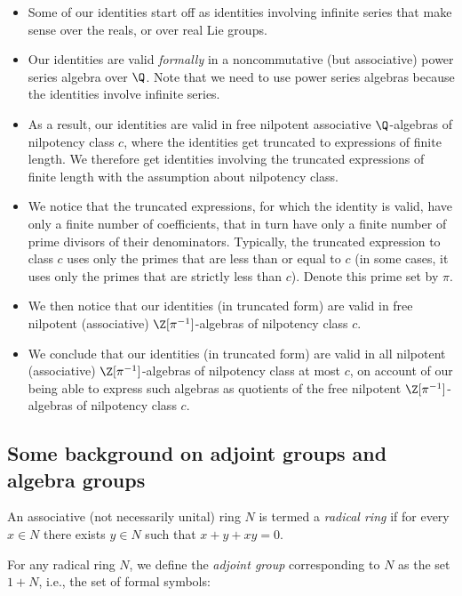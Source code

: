 \documentclass{ucetd}
\begin{document}
\begin{itemize}
\item Some of our identities start off as identities involving
  infinite series that make sense over the reals, or over real Lie
  groups.
\item Our identities are valid {\em formally} in a noncommutative (but
  associative) power series algebra over $\Q$. Note that we need to
  use power series algebras because the identities involve infinite
  series.
\item As a result, our identities are valid in free nilpotent
  associative $\Q$-algebras of nilpotency class $c$, where the
  identities get truncated to expressions of finite length. We
  therefore get identities involving the truncated expressions of
  finite length with the assumption about nilpotency class.
\item We notice that the truncated expressions, for which the identity
  is valid, have only a finite number of coefficients, that in turn
  have only a finite number of prime divisors of their
  denominators. Typically, the truncated expression to class $c$ uses
  only the primes that are less than or equal to $c$ (in some cases,
  it uses only the primes that are strictly less than $c$). Denote
  this prime set by $\pi$.
\item We then notice that our identities (in truncated form) are valid
  in free nilpotent (associative) $\Z[\pi^{-1}]$-algebras of
  nilpotency class $c$.
\item We conclude that our identities (in truncated form) are valid in
  all nilpotent (associative) $\Z[\pi^{-1}]$-algebras of nilpotency
  class at most $c$, on account of our being able to express such
  algebras as quotients of the free nilpotent $\Z[\pi^{-1}]$-algebras
  of nilpotency class $c$.
\end{itemize}

\subsection{Some background on adjoint groups and algebra groups}\label{sec:adjoint-group}

An associative (not necessarily unital) ring $N$ is termed a {\em
  radical ring} if for every $x \in N$ there exists $y \in N$ such
that $x + y + xy = 0$.

For any radical ring $N$, we define the {\em adjoint group}
corresponding to $N$ as the set $1 + N$, i.e., the set of formal symbols:
\end{document}
